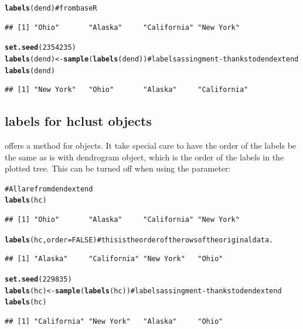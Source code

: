 \documentclass[shortnames,nojss,article]{jss}\usepackage{graphicx, color}
\makeatletter
\newcommand{\hlfunctioncall}[1]{\textcolor[rgb]{0.501960784313725,0,0.329411764705882}{\textbf{#1}}}%
\newcommand{\hlcomment}[1]{\textcolor[rgb]{0.180392156862745,0.6,0.341176470588235}{#1}}%
\newenvironment{kframe}{%
 \def\at@end@of@kframe{}%
 \ifinner\ifhmode%
  \def\at@end@of@kframe{\end{minipage}}%
  \begin{minipage}{\columnwidth}%
 \fi\fi%
 \def\FrameCommand##1{\hskip\@totalleftmargin \hskip-\fboxsep
 \colorbox{shadecolor}{##1}\hskip-\fboxsep
     \hskip-\linewidth \hskip-\@totalleftmargin \hskip\columnwidth}%
 \MakeFramed {\advance\hsize-\width
   \@totalleftmargin\z@ \linewidth\hsize
   \@setminipage}}%
 {\par\unskip\endMakeFramed%
 \at@end@of@kframe}
\newenvironment{knitrout}{}{} %
\makeatother
\begin{document}
\begin{knitrout}
\color{fgcolor}\begin{kframe}
\begin{alltt}
\hlfunctioncall{labels}(dend)  \hlcomment{# from base R}
\end{alltt}
\begin{verbatim}
## [1] "Ohio"       "Alaska"     "California" "New York"
\end{verbatim}
\begin{alltt}
\hlfunctioncall{set.seed}(2354235)
\hlfunctioncall{labels}(dend) <- \hlfunctioncall{sample}(\hlfunctioncall{labels}(dend))  \hlcomment{# labels assingment - thanks to dendextend}
\hlfunctioncall{labels}(dend)
\end{alltt}
\begin{verbatim}
## [1] "New York"   "Ohio"       "Alaska"     "California"
\end{verbatim}
\end{kframe}
\end{knitrout}



\subsection{labels for hclust objects}

 offers a  method for  objects. It take special care to have the order of the labels be the same as is with dendrogram object, which is the order of the labels in the plotted tree. This can be turned off when using the  parameter:

\begin{knitrout}
\color{fgcolor}\begin{kframe}
\begin{alltt}
\hlcomment{# All are from dendextend}
\hlfunctioncall{labels}(hc)
\end{alltt}
\begin{verbatim}
## [1] "Ohio"       "Alaska"     "California" "New York"
\end{verbatim}
\begin{alltt}
\hlfunctioncall{labels}(hc, order = FALSE)  \hlcomment{# this is the order of the rows of the original data.}
\end{alltt}
\begin{verbatim}
## [1] "Alaska"     "California" "New York"   "Ohio"
\end{verbatim}
\begin{alltt}
\hlfunctioncall{set.seed}(229835)
\hlfunctioncall{labels}(hc) <- \hlfunctioncall{sample}(\hlfunctioncall{labels}(hc))  \hlcomment{# labels assingment - thanks to dendextend}
\hlfunctioncall{labels}(hc)
\end{alltt}
\begin{verbatim}
## [1] "California" "New York"   "Alaska"     "Ohio"
\end{verbatim}
\end{kframe}
\end{knitrout}
\end{document}
